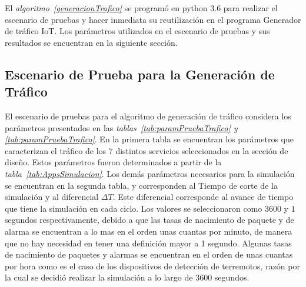 El \textit{algoritmo~\ref{generacionTrafico}} se programó en python 3.6 para realizar el escenario de pruebas y hacer inmediata su reutilización en el programa Generador de tráfico IoT. Los parámetros utilizados en el escenario de pruebas y sus resultados se encuentran en la siguiente sección.\newline

\subsection{Escenario de Prueba para la Generación de Tráfico}

El escenario de pruebas para el algoritmo de generación de tráfico considera los parámetros presentados en las \textit{tablas~\ref{tab:paramPruebaTrafico} y \ref{tab:paramPruebaTrafico}}.  En la primera tabla se encuentran los parámetros que caracterizan el tráfico de los 7 distintos servicios seleccionados en la sección de diseño. Estos parámetros fueron determinados a partir de la \textit{tabla~\ref{tab:AppsSimulacion}}. Los demás parámetros necesarios para la simulación se encuentran en la segunda tabla, y corresponden al Tiempo de corte de la simulación y al diferencial $\Delta T$. Este diferencial corresponde al avance de tiempo que tiene la simulación en cada ciclo. Los valores se seleccionaron como $3600$ y $1$ segundos respectivamente, debido a que las tasas de nacimiento de paquete y de alarma se encuentran a lo mas en el orden unas cuantas por minuto, de manera que no hay necesidad en tener una definición mayor a 1 segundo. Algunas tasas de nacimiento de paquetes y alarmas se encuentran en el orden de unas cuantas por hora como es el caso de los dispositivos de detección de terremotos, razón por la cual se decidió realizar la simulación a lo largo de 3600 segundos.\newline

